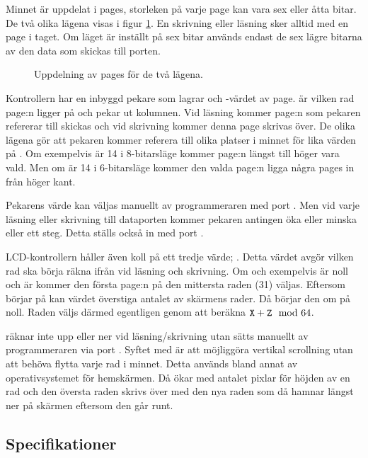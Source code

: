 \documentclass[main.tex]{subfiles}
\begin{document}
Minnet är uppdelat i pages, storleken på varje page kan vara sex eller åtta
bitar. De två olika lägena visas i figur \ref{fig:lcdpages}. En skrivning eller
läsning sker alltid med en page i taget. Om läget är inställt på sex bitar
används endast de sex lägre bitarna av den data som skickas till porten.

\begin{figure}[b]
    \centering
    
    \caption{Uppdelning av pages för de två lägena.}
    \label{fig:lcdpages}
\end{figure}

Kontrollern har en inbyggd pekare som lagrar  och -värdet av
page.  är vilken rad page:n ligger på och  pekar ut kolumnen.
Vid läsning kommer page:n som pekaren refererar till skickas och vid skrivning
kommer denna page skrivas över. De olika lägena gör att pekaren kommer referera
till olika platser i minnet för lika värden på . Om  exempelvis
är 14 i 8-bitarsläge kommer page:n längst till höger vara vald. Men om 
är 14 i 6-bitarsläge kommer den valda page:n ligga några pages in från höger
kant.

Pekarens värde kan väljas manuellt av programmeraren med port . Men
vid varje läsning eller skrivning till dataporten  kommer pekaren
antingen öka eller minska  eller  ett steg. Detta ställs också
in med port .

LCD-kontrollern håller även koll på ett tredje värde; . Detta värdet
avgör vilken rad  ska börja räkna ifrån vid läsning och skrivning.  Om
 och  exempelvis är noll och  är  kommer den
första page:n på den mittersta raden (31) väljas. Eftersom  börjar på
 kan värdet överstiga antalet av skärmens rader. Då börjar den om på
noll. Raden väljs därmed egentligen genom att beräkna $\texttt{X}+\texttt{Z} \mod
64$.

 räknar inte upp eller ner vid läsning/skrivning utan sätts manuellt av
programmeraren via port . Syftet med  är att möjliggöra
vertikal scrollning utan att behöva flytta varje rad i minnet. Detta används
bland annat av operativsystemet för hemskärmen. Då ökar  med antalet
pixlar för höjden av en rad och den översta raden skrivs över med den nya raden
som då hamnar längst ner på skärmen eftersom den går runt.

\subsection{Specifikationer}
\end{document}
